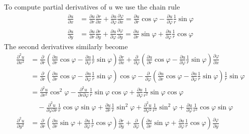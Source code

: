 To compute partial derivatives of $u$ we use the chain rule
\begin{align*}
\frac{\partial u}{\partial x}
&=
\frac{\partial u}{\partial r}
\frac{\partial r}{\partial x}
+
\frac{\partial u}{\partial\varphi}
\frac{\partial \varphi}{\partial x}
=
\frac{\partial u}{\partial r}
\cos\varphi
-
\frac{\partial u}{\partial\varphi}
\frac1r\sin\varphi
\\
\frac{\partial u}{\partial y}
&=
\frac{\partial u}{\partial r}
\frac{\partial r}{\partial y}
+
\frac{\partial u}{\partial\varphi}
\frac{\partial \varphi}{\partial y}
=
\frac{\partial u}{\partial r}
\sin\varphi
+
\frac{\partial u}{\partial\varphi}
\frac1r\cos\varphi
\end{align*}
The second derivatives similarly become
\begin{align*}
\frac{\partial^2u}{\partial x^2}
&=
\frac{\partial}{\partial r}
\left(
\frac{\partial u}{\partial r}
\cos\varphi
-
\frac{\partial u}{\partial\varphi}
\frac1r\sin\varphi
\right)
\frac{\partial r}{\partial x}
+
\frac{\partial }{\partial \varphi}
\left(
\frac{\partial u}{\partial r}
\cos\varphi
-
\frac{\partial u}{\partial\varphi}
\frac1r\sin\varphi
\right)
\frac{\partial\varphi}{\partial x}
\\
&=
\frac{\partial}{\partial r}
\left(
\frac{\partial u}{\partial r}
\cos\varphi
-
\frac{\partial u}{\partial\varphi}
\frac1r\sin\varphi
\right)
\cos\varphi
-
\frac{\partial }{\partial \varphi}
\left(
\frac{\partial u}{\partial r}
\cos\varphi
-
\frac{\partial u}{\partial\varphi}
\frac1r\sin\varphi
\right)
\frac1r\sin\varphi
\\
&=
\frac{\partial^2u}{\partial r^2} \cos^2\varphi
-
\frac{\partial^2u}{\partial r\partial\varphi} \frac1r\sin\varphi \cos\varphi
+
\frac{\partial u}{\partial\varphi} \frac1{r^2}\sin\varphi\cos\varphi
\\
&\quad
-
\frac{\partial^2u}{\partial\varphi\partial r}\frac1r \cos\varphi\sin\varphi
+\frac{\partial u}{\partial r}\frac1r\sin^2\varphi
+\frac{\partial^2u}{\partial\varphi^2}
\frac1{r^2}\sin^2\varphi
+\frac{\partial u}{\partial\varphi}\frac1{r^2}\cos\varphi\sin\varphi
\\
\frac{\partial^2u}{\partial y^2}
&=
\frac{\partial}{\partial r}
\left(
\frac{\partial u}{\partial r}
\sin\varphi
+
\frac{\partial u}{\partial\varphi}
\frac1r\cos\varphi
\right)
\frac{\partial r}{\partial y}
+
\frac{\partial}{\partial \varphi}
\left(
\frac{\partial u}{\partial r}
\sin\varphi
+
\frac{\partial u}{\partial\varphi}
\frac1r\cos\varphi
\right)
\frac{\partial \varphi}{\partial y}
\\

\end{align*}

